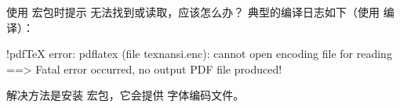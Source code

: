 \begin{myQA}{使用  宏包时提示  无法找到或读取，应该怎么办？}
	典型的编译日志如下（使用  编译）：
\begin{myCode}
!pdfTeX error: pdflatex (file texnansi.enc): cannot open encoding file for reading
==> Fatal error occurred, no output PDF file produced!
\end{myCode}
	解决方法是安装  宏包，它会提供  字体编码文件。
\end{myQA}